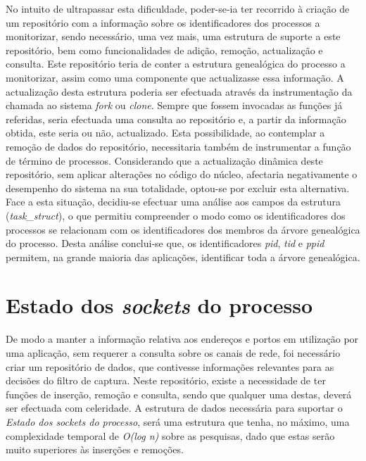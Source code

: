 No intuito de ultrapassar esta dificuldade, poder-se-ia ter recorrido à criação de um repositório com a informação sobre os identificadores dos processos a monitorizar, sendo necessário, uma vez mais, uma estrutura de suporte a este repositório, bem como funcionalidades de adição, remoção, actualização e consulta.
Este repositório teria de conter a estrutura genealógica do processo a monitorizar, assim como uma componente que actualizasse essa informação.
A actualização desta estrutura poderia ser efectuada através da instrumentação da chamada ao sistema \textit{fork} ou \textit{clone}.
Sempre que fossem invocadas as funções já referidas, seria efectuada uma consulta ao repositório e, a partir da informação obtida, este seria ou não, actualizado.
Esta possibilidade, ao contemplar a remoção de dados do repositório, necessitaria também de instrumentar a função de término de processos.
Considerando que a actualização dinâmica deste repositório, sem aplicar alterações no código do núcleo, afectaria negativamente o desempenho do sistema na sua totalidade, optou-se por excluir esta alternativa.
Face a esta situação, decidiu-se efectuar uma análise aos campos da estrutura (\textit{task\_struct}), o que permitiu compreender o modo como os identificadores dos processos se relacionam com os identificadores dos membros da árvore genealógica do processo.
Desta análise conclui-se que, os identificadores \textit{pid}, \textit{tid} e \textit{ppid} permitem, na grande maioria das aplicações, identificar toda a árvore genealógica.





\section{Estado dos \textit{sockets} do processo}

De modo a manter a informação relativa aos endereços e portos em utilização por uma aplicação, sem requerer a consulta sobre os canais de rede, foi necessário criar um repositório de dados, que contivesse informações relevantes para as decisões do filtro de captura.
Neste repositório, existe a necessidade de ter funções de inserção, remoção e consulta, sendo que qualquer uma destas, deverá ser efectuada com celeridade.
A estrutura de dados necessária para suportar o \textit{Estado dos sockets do processo}, será uma estrutura que tenha, no máximo, uma complexidade temporal de \textit{O(log n)} sobre as pesquisas, dado que estas serão muito superiores às inserções e remoções.

